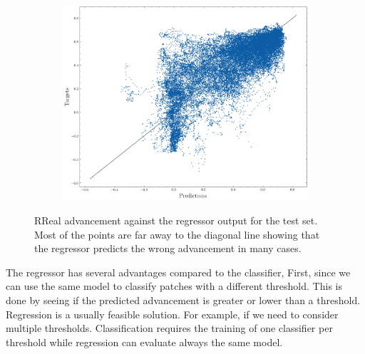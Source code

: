 \documentclass[../document.tex]{subfiles}
\begin{document}
\begin{figure}[htbp]
  \centering
  \begin{subfigure}[b]{1\linewidth}
    \includegraphics[width=\linewidth]{../img/4/regression_scatter.png} 
  \end{subfigure}
  \caption{RReal advancement against the regressor output for the test set. Most of the points are far away to the diagonal line showing that the regressor predicts the wrong advancement in many cases.}
  \label{fig : regression-preds-targs}
\end{figure}
The regressor has several advantages compared to the classifier, First, since we can use the same model to classify patches with a different threshold. This is done by seeing if the predicted advancement is greater or lower than a threshold. Regression is a usually feasible solution. For example, if we need to consider multiple thresholds. Classification requires the training of one classifier per threshold while regression can evaluate always the same model.
\end{document}
